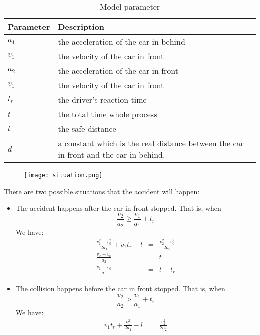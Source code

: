 \begin{table}
\centering
\begin{tabular}{ll}
\hline
Parameter & Description\\
\hline
$a_1$ & the acceleration of the  car in behind \\
$v_1$ & the velocity of the  car in front \\
$a_2$ & the acceleration of the car in front \\
$v_1$ & the velocity of the  car in front \\
$t_r$ & the driver's reaction time \\
$t$ & the total time whole process \\
$l$ & the safe distance \\
$d$ & a constant which is the real distance between the 
car in front and the car in behind.\\
\hline
\end{tabular}
\caption{Model parameter}
\end{table}

\begin{figure}[h]
\small
\centering
\texttt{[image: situation.png]}
\caption{}
\end{figure}

There are two possible situations that the accident will 
happen:
\begin{itemize}
\item The accident happens after the car in front stopped.
That is, when
\begin{displaymath}
\frac{v_2}{a_2}  \geq  \frac{v_1}{a_1} + t_r
\end{displaymath}
We have:
\begin{eqnarray}
\frac{v_1^2 - v_0 ^ 2}{2a_1} + v_1 t_r - l & = & \frac{v_2 ^ 2 - v_0 ^ 2}{2a_2}\\
\frac{v_2 - v_0}{a_2} & = & t\\
\frac{v_1 - v_0}{a_1} & = & t - t_r
\end{eqnarray}
\item The collision happens before the car in front stopped. 
That is, when
\begin{displaymath}
\frac{v_2}{a_2}  >  \frac{v_1}{a_1} + t_r
\end{displaymath}
We have:
\begin{eqnarray}
v_1 t_r + \frac{v_1 ^ 2}{2a_1} - l& = &\frac{v_2^2}{2a_2}
\end{eqnarray}
\end{itemize}

